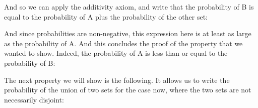 \documentclass[pdftex, brazil, 12pt, twoside]{article}
\begin{document}
And so we can apply the additivity axiom, and write
that the probability of B is equal to the probability of A
plus the probability of the other set:

\begin{figure}[H]
  \begin{center}
  \end{center}
\end{figure}

And since probabilities are non-negative, this expression
here is at least as large as the probability of A. And this
concludes the proof of the property that
we wanted to show.
Indeed, the probability of A is less than or equal to the
probability of B:

\begin{figure}[H]
  \begin{center}
  \end{center}
\end{figure}

The next property we will show is the following.
It allows us to write the probability of the union of
two sets for the case now, where the two sets are not
necessarily disjoint:

\begin{figure}[H]
  \begin{center}
  \end{center}
\end{figure}
\end{document}

